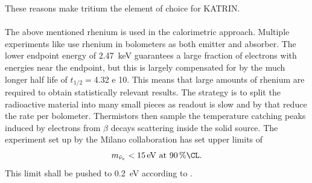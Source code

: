     These reasons make tritium the element of choice for KATRIN.\\\\
    The above mentioned rhenium is used in the calorimetric approach. Multiple experiments like  use rhenium in bolometers as both emitter and absorber. The lower endpoint energy of \SI{2.47}{\kilo\electronvolt} guarantees a large fraction of electrons with energies near the endpoint, but this is largely compensated for by the much longer half life of $t_{1/2} = $\SI{4.32 e 10}{\year}. This means that large amounts of rhenium are required to obtain statistically relevant results. The strategy is to split the radioactive material into many small pieces as readout is slow and by that reduce the rate per bolometer. Thermistors then sample the temperature catching peaks induced by electrons from $\beta$ decays scattering inside the solid source.
    The experiment set up by the Milano collaboration has set upper limits of
    \begin{equation}
    	m_{\bar\nu_e} < \SI{15}{\electronvolt} ~ {\rm at}~ \SI{90}{\percent\CL}.
    \end{equation}
    This limit shall be pushed to \SI{0.2}{\electronvolt} according to \cite{MARE2007}.  

